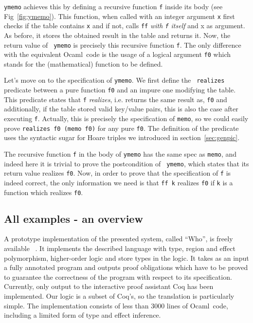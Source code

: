 \documentclass[a4paper]{llncs}
\newcommand{\who}{Who}
\newcommand{\ocaml}{Ocaml}
\begin{document}
{\tt ymemo} achieves this by defining a recursive function {\tt f} inside its
body (see Fig~\ref{fig:ymemo}). This function, when called with an integer
argument {\tt x} first checks if the table contains {\tt x} and if not, calls
{\tt ff} {\em with {\tt f} itself} and x as argument. As before, it stores the
obtained result in the table and returns it. Now, the return value of {\tt
ymemo} is precisely this recursive function {\tt f}. The only difference with
the equivalent \ocaml\ code is the usage of a logical argument {\tt f0} which
stands for the (mathematical) function to be defined.

Let's move on to the specification of {\tt ymemo}. We first define the {\tt
realizes} predicate between a pure function {\tt f0} and an impure one
modifying the table. This predicate states that {\tt f} {\em realizes}, i.e.
returns the same result as, {\tt f0} and additionally, if the table stored
valid key/value pairs, this is also the case after executing {\tt f}.
Actually, this is precisely the specification of {\tt memo}, so we could
easily prove {\tt realizes f0~(memo f0)} for any pure {\tt f0}. The definition
of the predicate uses the syntactic sugar for Hoare triples we introduced in
section~\ref{sec:genpic}. 

The recursive function {\tt f} in the body of {\tt ymemo} has the same spec as
{\tt memo}, and indeed here it is trivial to prove the postcondition of {\tt
ymemo}, which states that its return value realizes {\tt f0}. Now, in order to
prove that the specification of {\tt f} is indeed correct, the only
information we need is that {\tt ff k} realizes {\tt f0} if {\tt k} is a
function which realizes {\tt f0}.

\subsection{All examples - an overview}

A prototype implementation of the presented system, called ``\who'',
 is freely available~\cite{KanigFilliatre09wml}%
. It implements the
described language with type, region and effect polymorphism, higher-order
logic and store types in the logic. It takes as an input a fully annotated
program and outputs proof obligations which have to be proved to guarantee the
correctness of the program with respect to its specification. Currently, only
output to the interactive proof assistant Coq has been implemented. Our logic
is a subset of Coq's, so the translation is particularly simple.
The implementation consists of less than 3000 lines of \ocaml\ code, including
a limited form of type and effect inference.
\end{document}
